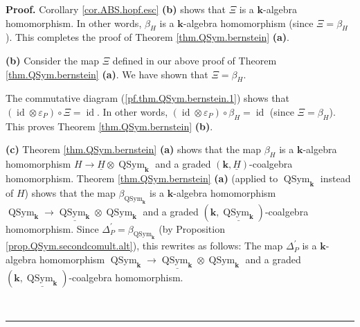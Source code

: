 \documentclass[numbers=enddot,12pt,final,onecolumn,notitlepage,abstracton]{scrartcl}%
\theoremstyle{definition}
\newenvironment{proof}[1][Proof]{\noindent\textbf{#1.} }{\ \rule{0.5em}{0.5em}}
\begin{document}
\begin{proof}
Corollary \ref{cor.ABS.hopf.esc} \textbf{(b)} shows that $\Xi$ is a
$\mathbf{k}$-algebra homomorphism. In other words, $\beta_{H}$ is a
$\mathbf{k}$-algebra homomorphism (since $\Xi=\beta_{H}$). This completes the
proof of Theorem \ref{thm.QSym.bernstein} \textbf{(a)}.

\textbf{(b)} Consider the map $\Xi$ defined in our above proof of Theorem
\ref{thm.QSym.bernstein} \textbf{(a)}. We have shown that $\Xi=\beta_{H}$.

The commutative diagram (\ref{pf.thm.QSym.bernstein.1}) shows that $\left(
\operatorname*{id}\otimes\varepsilon_{P}\right)  \circ\Xi=\operatorname*{id}$.
In other words, $\left(  \operatorname*{id}\otimes\varepsilon_{P}\right)
\circ\beta_{H}=\operatorname*{id}$ (since $\Xi=\beta_{H}$). This proves
Theorem \ref{thm.QSym.bernstein} \textbf{(b)}.

\textbf{(c)} Theorem \ref{thm.QSym.bernstein} \textbf{(a)} shows that the map
$\beta_{H}$ is a $\mathbf{k}$-algebra homomorphism $H\rightarrow
\underline{H}\otimes\operatorname*{QSym}\nolimits_{\mathbf{k}}$ and a graded
$\left(  \mathbf{k},\underline{H}\right)  $-coalgebra homomorphism. Theorem
\ref{thm.QSym.bernstein} \textbf{(a)} (applied to $\operatorname*{QSym}%
\nolimits_{\mathbf{k}}$ instead of $H$) shows that the map $\beta
_{\operatorname*{QSym}\nolimits_{\mathbf{k}}}$ is a $\mathbf{k}$-algebra
homomorphism $\operatorname*{QSym}\nolimits_{\mathbf{k}}\rightarrow
\underline{\operatorname*{QSym}\nolimits_{\mathbf{k}}}\otimes
\operatorname*{QSym}\nolimits_{\mathbf{k}}$ and a graded $\left(
\mathbf{k},\underline{\operatorname*{QSym}\nolimits_{\mathbf{k}}}\right)
$-coalgebra homomorphism. Since $\Delta_{P}^{\prime}=\beta
_{\operatorname*{QSym}\nolimits_{\mathbf{k}}}$ (by Proposition
\ref{prop.QSym.secondcomult.alt}), this rewrites as follows: The map
$\Delta_{P}^{\prime}$ is a $\mathbf{k}$-algebra homomorphism
$\operatorname*{QSym}\nolimits_{\mathbf{k}}\rightarrow
\underline{\operatorname*{QSym}\nolimits_{\mathbf{k}}}\otimes
\operatorname*{QSym}\nolimits_{\mathbf{k}}$ and a graded $\left(
\mathbf{k},\underline{\operatorname*{QSym}\nolimits_{\mathbf{k}}}\right)
$-coalgebra homomorphism.


\end{proof}
\end{document}
